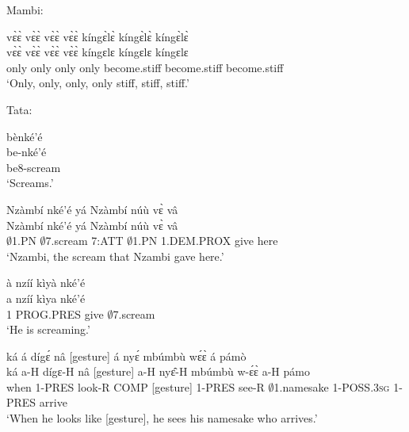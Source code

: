 \noindent Mambi:

\begin{exe} 
\exN\label{204} 
  \glll vɛ̀ɛ̀ vɛ̀ɛ̀ vɛ̀ɛ̀ vɛ̀ɛ̀ kíngɛ̀lɛ̀ kíngɛ̀lɛ̀ kíngɛ̀lɛ̀ \\
         vɛ̀ɛ̀ vɛ̀ɛ̀ vɛ̀ɛ̀ vɛ̀ɛ̀ kíngɛlɛ kíngɛlɛ kíngɛlɛ \\
        only only only only become.stiff become.stiff become.stiff \\
    \trans `Only, only, only, only stiff, stiff, stiff.'
\end{exe}

\noindent Tata:

\begin{exe} 
\exN\label{205}
  \glll bènké'é \\
        be-nké'é \\
        be8-scream \\
    \trans `Screams.'
\end{exe}

\begin{exe} 
\exN\label{206}
  \glll Nzàmbí nké'é yá Nzàmbí núù vɛ̀ vâ\\
         Nzàmbí nké'é yá Nzàmbí núù vɛ̀ vâ \\
      $\emptyset$1.PN $\emptyset$7.scream 7:ATT $\emptyset$1.PN 1.DEM.PROX give here   \\
    \trans `Nzambi, the scream that Nzambi gave here.'
\end{exe}

\begin{exe} 
\exN\label{207}
  \glll à nzíí kìyà nké'é \\
          a nzíí kìya nké'é \\
        1 PROG.PRES give $\emptyset$7.scream \\
    \trans `He is screaming.'
\end{exe}

\begin{exe} 
\exN\label{208}
  \glll ká á dígɛ́ nâ [gesture] á nyɛ́ mbúmbù wɛ́ɛ̀ á pámò \\
        ká a-H dígɛ-H nâ [gesture] a-H nyɛ̂-H mbúmbù w-ɛ́ɛ̀ a-H pámo \\
       when 1-PRES look-R COMP [gesture]  1-PRES see-R $\emptyset$1.namesake 1-POSS.3\textsc{sg} 1-PRES arrive \\
    \trans `When he looks like [gesture], he sees his namesake who arrives.'
\end{exe}


